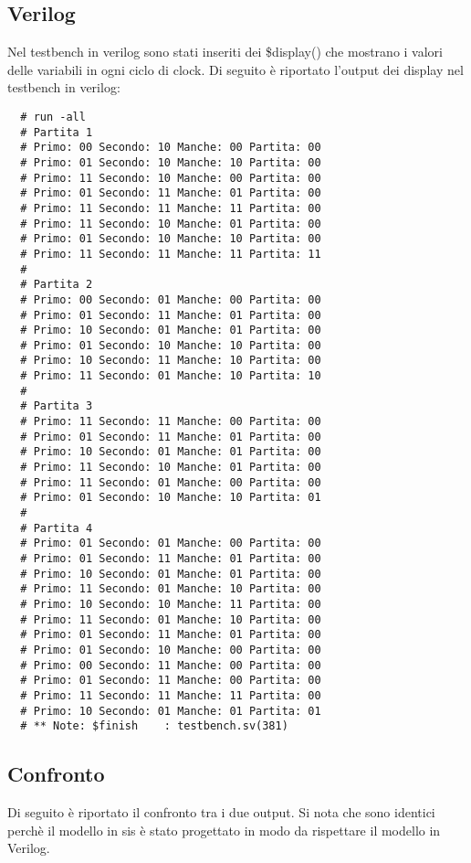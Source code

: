 \documentclass[a4paper]{article}
\begin{document}
\subsection{Verilog}
Nel testbench in verilog sono stati inseriti dei \$display() che mostrano i valori delle variabili in ogni ciclo di clock.
Di seguito è riportato l'output dei display nel testbench in verilog:
\begin{lstlisting}
  # run -all
  # Partita 1
  # Primo: 00 Secondo: 10 Manche: 00 Partita: 00
  # Primo: 01 Secondo: 10 Manche: 10 Partita: 00
  # Primo: 11 Secondo: 10 Manche: 00 Partita: 00
  # Primo: 01 Secondo: 11 Manche: 01 Partita: 00
  # Primo: 11 Secondo: 11 Manche: 11 Partita: 00
  # Primo: 11 Secondo: 10 Manche: 01 Partita: 00
  # Primo: 01 Secondo: 10 Manche: 10 Partita: 00
  # Primo: 11 Secondo: 11 Manche: 11 Partita: 11
  # 
  # Partita 2
  # Primo: 00 Secondo: 01 Manche: 00 Partita: 00
  # Primo: 01 Secondo: 11 Manche: 01 Partita: 00
  # Primo: 10 Secondo: 01 Manche: 01 Partita: 00
  # Primo: 01 Secondo: 10 Manche: 10 Partita: 00
  # Primo: 10 Secondo: 11 Manche: 10 Partita: 00
  # Primo: 11 Secondo: 01 Manche: 10 Partita: 10
  # 
  # Partita 3
  # Primo: 11 Secondo: 11 Manche: 00 Partita: 00
  # Primo: 01 Secondo: 11 Manche: 01 Partita: 00
  # Primo: 10 Secondo: 01 Manche: 01 Partita: 00
  # Primo: 11 Secondo: 10 Manche: 01 Partita: 00
  # Primo: 11 Secondo: 01 Manche: 00 Partita: 00
  # Primo: 01 Secondo: 10 Manche: 10 Partita: 01
  # 
  # Partita 4
  # Primo: 01 Secondo: 01 Manche: 00 Partita: 00
  # Primo: 01 Secondo: 11 Manche: 01 Partita: 00
  # Primo: 10 Secondo: 01 Manche: 01 Partita: 00
  # Primo: 11 Secondo: 01 Manche: 10 Partita: 00
  # Primo: 10 Secondo: 10 Manche: 11 Partita: 00
  # Primo: 11 Secondo: 01 Manche: 10 Partita: 00
  # Primo: 01 Secondo: 11 Manche: 01 Partita: 00
  # Primo: 01 Secondo: 10 Manche: 00 Partita: 00
  # Primo: 00 Secondo: 11 Manche: 00 Partita: 00
  # Primo: 01 Secondo: 11 Manche: 00 Partita: 00
  # Primo: 11 Secondo: 11 Manche: 11 Partita: 00
  # Primo: 10 Secondo: 01 Manche: 01 Partita: 01
  # ** Note: $finish    : testbench.sv(381)
\end{lstlisting}

\subsection{Confronto}
Di seguito è riportato il confronto tra i due output. Si nota che sono identici perchè il modello in sis 
è stato progettato in modo da rispettare il modello in Verilog.
\end{document}

